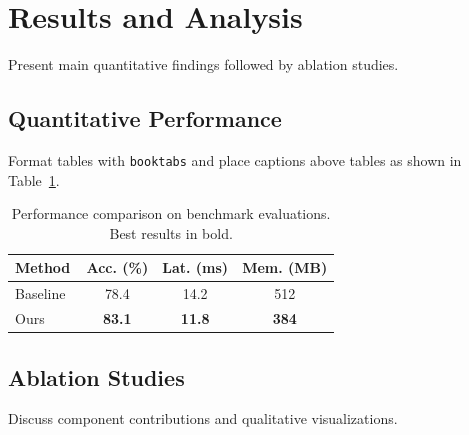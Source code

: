 \section{Results and Analysis}
\label{sec:results}

Present main quantitative findings followed by ablation studies.

\subsection{Quantitative Performance}
Format tables with \texttt{booktabs} and place captions above tables as shown in Table~\ref{tab:main_results}.

\begin{table}[t]
    \centering
    \caption{Performance comparison on benchmark evaluations. Best results in bold.}
    \label{tab:main_results}
    \begin{tabular}{lccc}
        \toprule
        Method & Acc. (\%) & Lat. (ms) & Mem. (MB) \\
        \midrule
        Baseline~\cite{he2016deep} & 78.4 & 14.2 & 512 \\
        Ours & \textbf{83.1} & \textbf{11.8} & \textbf{384} \\
        \bottomrule
    \end{tabular}
\end{table}

\subsection{Ablation Studies}
Discuss component contributions and qualitative visualizations.
